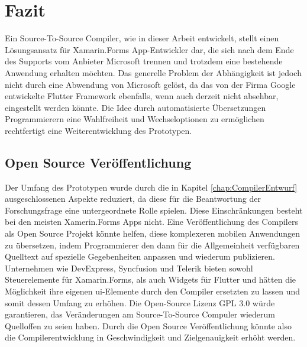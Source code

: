 \chapter{Fazit}
\label{chap:FazitAusblick}
Ein Source-To-Source Compiler,  wie in dieser Arbeit entwickelt, stellt einen Lösungsansatz für Xamarin.Forms App-Entwickler dar,  die sich nach dem Ende des Supports vom Anbieter Microsoft trennen und trotzdem eine bestehende Anwendung erhalten möchten.  Das generelle Problem der Abhängigkeit ist jedoch nicht durch eine Abwendung von Microsoft gelöst, da das von der Firma Google entwickelte Flutter Framework ebenfalls, wenn auch derzeit nicht absehbar,  eingestellt werden könnte.  Die Idee durch automatisierte Übersetzungen Programmierern eine Wahlfreiheit und Wechseloptionen zu ermöglichen rechtfertigt eine Weiterentwicklung des Prototypen.

\section{Open Source Veröffentlichung}

Der Umfang des Prototypen wurde durch die in Kapitel \ref{chap:CompilerEntwurf} ausgeschlossenen Aspekte reduziert,  da diese für die Beantwortung der Forschungsfrage eine untergeordnete Rolle spielen.  Diese Einschränkungen besteht bei den meisten Xamerin.Forms Apps nicht.  
Eine Veröffentlichung des Compilers als Open Source Projekt könnte helfen, diese komplexeren 
mobilen Anwendungen zu übersetzen,  indem Programmierer den dann für die Allgemeinheit verfügbaren Quelltext auf spezielle Gegebenheiten anpassen und wiederum publizieren.  
Unternehmen wie DevExpress,  Syncfusion und Telerik bieten sowohl Steuerelemente für 
Xamarin.Forms,  als auch Widgets für Flutter und hätten die Möglichkeit ihre eigenen \ac{ui}-Elemente 
durch den Compiler ersetzten zu lassen und somit dessen Umfang zu erhöhen.  Die Open-Source Lizenz GPL 3.0 würde garantieren,  das Veränderungen am Source-To-Source Compuler wiederum Quelloffen zu seien haben.  Durch die Open Source Veröffentlichung könnte also die Compilerentwicklung in Geschwindigkeit und Zielgenauigkeit erhöht werden.

